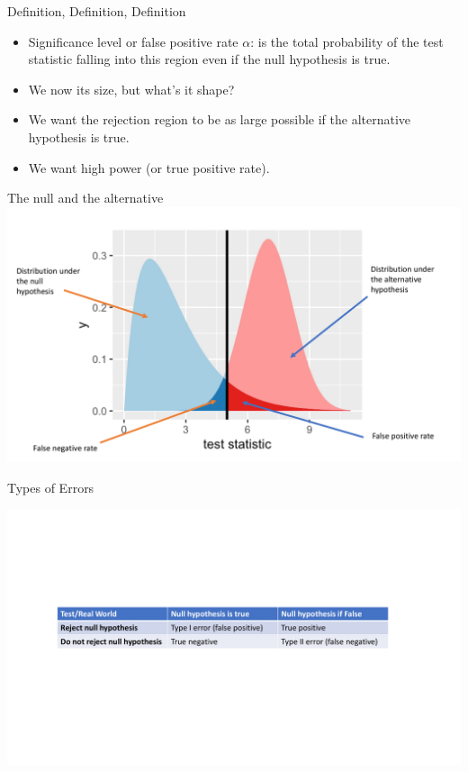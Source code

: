 \documentclass{bredelebeamer}
\begin{document}
\begin{frame}
\begin{block}{Definition, Definition, Definition}
	
	\begin{itemize}
		\item Significance level or false positive rate $\alpha$: is the total probability of the test statistic falling into this region even if the null hypothesis is true.
		
		\item We now its size, but what's it shape?
		
		\item  We want the rejection region to be as large possible if the alternative hypothesis is true.
		
		\item We want high power (or true positive rate).
	\end{itemize}
	
\end{block}

\end{frame}

\begin{frame}{The null and the alternative}
\includegraphics[width=1\textwidth]{nullalt}
\end{frame}

\begin{frame}{Types of Errors}

\includegraphics[width=1.2\textwidth]{typeerrors}

\end{frame}
\end{document}
